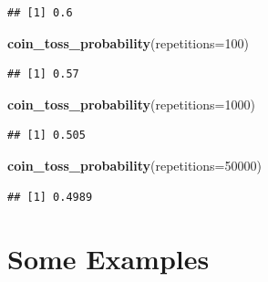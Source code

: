 \documentclass[]{book}
\newenvironment{Shaded}{\begin{snugshade}}{\end{snugshade}}
\newcommand{\DataTypeTok}[1]{\textcolor[rgb]{0.13,0.29,0.53}{#1}}
\newcommand{\DecValTok}[1]{\textcolor[rgb]{0.00,0.00,0.81}{#1}}
\newcommand{\KeywordTok}[1]{\textcolor[rgb]{0.13,0.29,0.53}{\textbf{#1}}}
\newcommand{\NormalTok}[1]{#1}
\theoremstyle{definition}
\theoremstyle{definition}
\theoremstyle{definition}
\theoremstyle{remark}
\begin{document}
\begin{verbatim}
## [1] 0.6
\end{verbatim}

\begin{Shaded}
\begin{Highlighting}[]
\KeywordTok{coin_toss_probability}\NormalTok{(}\DataTypeTok{repetitions=}\DecValTok{100}\NormalTok{)}
\end{Highlighting}
\end{Shaded}

\begin{verbatim}
## [1] 0.57
\end{verbatim}

\begin{Shaded}
\begin{Highlighting}[]
\KeywordTok{coin_toss_probability}\NormalTok{(}\DataTypeTok{repetitions=}\DecValTok{1000}\NormalTok{)}
\end{Highlighting}
\end{Shaded}

\begin{verbatim}
## [1] 0.505
\end{verbatim}

\begin{Shaded}
\begin{Highlighting}[]
\KeywordTok{coin_toss_probability}\NormalTok{(}\DataTypeTok{repetitions=}\DecValTok{50000}\NormalTok{)}
\end{Highlighting}
\end{Shaded}

\begin{verbatim}
## [1] 0.4989
\end{verbatim}

\hypertarget{some-examples}{%
\section{Some Examples}\label{some-examples}}
\end{document}
